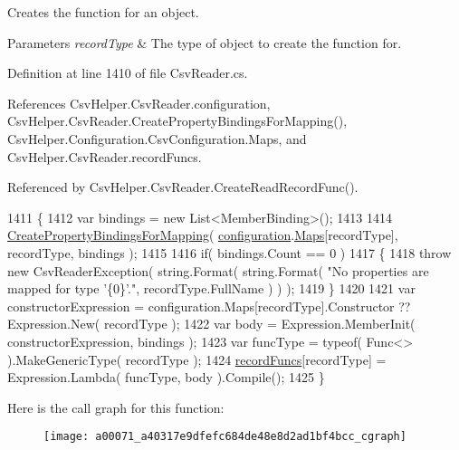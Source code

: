 Creates the function for an object. 


\begin{DoxyParams}{Parameters}
{\em record\-Type} & The type of object to create the function for.\\
\hline
\end{DoxyParams}


Definition at line 1410 of file Csv\-Reader.\-cs.



References Csv\-Helper.\-Csv\-Reader.\-configuration, Csv\-Helper.\-Csv\-Reader.\-Create\-Property\-Bindings\-For\-Mapping(), Csv\-Helper.\-Configuration.\-Csv\-Configuration.\-Maps, and Csv\-Helper.\-Csv\-Reader.\-record\-Funcs.



Referenced by Csv\-Helper.\-Csv\-Reader.\-Create\-Read\-Record\-Func().


\begin{DoxyCode}
1411         \{
1412             var bindings = \textcolor{keyword}{new} List<MemberBinding>();
1413 
1414             \hyperlink{a00071_a5d8c85bf8923d38ead3df9b9463f3eae}{CreatePropertyBindingsForMapping}( 
      \hyperlink{a00071_a695622911e45cbac8d67dcbd9a3e2967}{configuration}.\hyperlink{a00057_a9119c99f5dafba985718f631f7bfa16a}{Maps}[recordType], recordType, bindings );
1415 
1416             \textcolor{keywordflow}{if}( bindings.Count == 0 )
1417             \{
1418                 \textcolor{keywordflow}{throw} \textcolor{keyword}{new} CsvReaderException( \textcolor{keywordtype}{string}.Format( \textcolor{keywordtype}{string}.Format( \textcolor{stringliteral}{"No properties are mapped for
       type '\{0\}'."}, recordType.FullName ) ) );
1419             \}
1420 
1421             var constructorExpression = configuration.Maps[recordType].Constructor ?? Expression.New( 
      recordType );
1422             var body = Expression.MemberInit( constructorExpression, bindings );
1423             var funcType = typeof( Func<> ).MakeGenericType( recordType );
1424             \hyperlink{a00071_af8fa2e4c94750a1d6df3112d5f1d701c}{recordFuncs}[recordType] = Expression.Lambda( funcType, body ).Compile();
1425         \}
\end{DoxyCode}


Here is the call graph for this function\-:
\nopagebreak
\begin{figure}[H]
\begin{center}
\leavevmode
\texttt{[image: a00071\_a40317e9dfefc684de48e8d2ad1bf4bcc\_cgraph]}
\end{center}
\end{figure}




